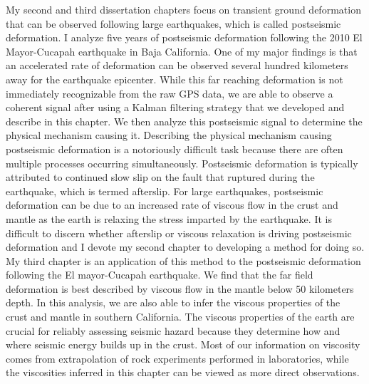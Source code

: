 My second and third dissertation chapters focus on transient ground deformation that can be observed following large earthquakes, which is called postseismic deformation.  I analyze five years of postseismic deformation following the 2010 El Mayor-Cucapah earthquake in Baja California.  One of my major findings is that an accelerated rate of deformation can be observed several hundred kilometers away for the earthquake epicenter.  While this far reaching deformation is not immediately recognizable from the raw GPS data, we are able to observe a coherent signal after using a Kalman filtering strategy that we developed and describe in this chapter.  We then analyze this postseismic signal to determine the physical mechanism causing it.  Describing the physical mechanism causing postseismic deformation is a notoriously difficult task because there are often multiple processes occurring simultaneously. Postseismic deformation is typically attributed to continued slow slip on the fault that ruptured during the earthquake, which is termed afterslip.  For large earthquakes, postseismic deformation can be due to an increased rate of viscous flow in the crust and mantle as the earth is relaxing the stress imparted by the earthquake. It is difficult to discern whether afterslip or viscous relaxation is driving postseismic deformation and I devote my second chapter to developing a method for doing so.  My third chapter is an application of this method to the postseismic deformation following the El mayor-Cucapah earthquake.  We find that the far field deformation is best described by viscous flow in the mantle below 50 kilometers depth. In this analysis, we are also able to infer the viscous properties of the crust and mantle in southern California.  The viscous properties of the earth are crucial for reliably assessing seismic hazard because they determine how and where seismic energy builds up in the crust.  Most of our information on viscosity comes from extrapolation of rock experiments performed in laboratories, while the viscosities inferred in this chapter can be viewed as more direct observations. 

